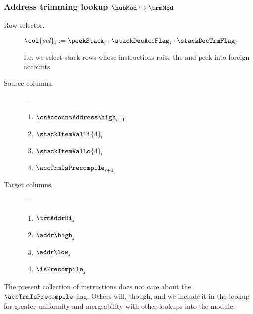 \subsubsection{Address trimming lookup $\hubMod \hookrightarrow \trmMod$}

\begin{description}
	\item[Row selector.] $\col{sel}_{i} := \peekStack_{i} \cdot \stackDecAccFlag_{i} \cdot \stackDecTrmFlag_{i}$

		I.e. we select stack rows whose instructions raise the \accFlag{} and peek into foreign accounts.
	\item[Source columns.] ---
		\begin{multicols}{4}
			\begin{enumerate}
				\item $\cnAccountAddress\high_{i + 1}$
				\item $\stackItemValHi{4}_{i}$
				\item $\stackItemValLo{4}_{i}$
				\item $\accTrmIsPrecompile_{i + 1}$
			\end{enumerate}
		\end{multicols}
	\item[Target columns.] ---
		\begin{multicols}{4}
			\begin{enumerate}
				\item $\trmAddrHi_{j}$
				\item $\addr\high_{j}$
				\item $\addr\low_{j}$
				\item $\isPrecompile_{j}$
			\end{enumerate}
		\end{multicols}
\end{description}
\saNote{} The present collection of instructions does not care about the $\accTrmIsPrecompile$ flag. Others will, though, and we include it in the lookup for greater uniformity and mergeability with other lookups into the \trmMod{} module.
